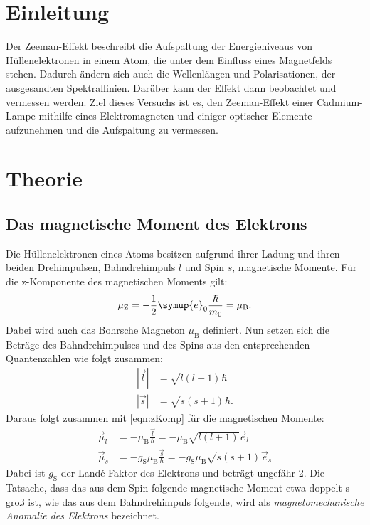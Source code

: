 \section{Einleitung}

Der Zeeman-Effekt beschreibt die Aufspaltung der Energieniveaus von Hüllenelektronen in einem Atom, die unter dem Einfluss eines Magnetfelds stehen. Dadurch ändern sich auch die Wellenlängen und Polarisationen, der ausgesandten Spektrallinien. Darüber kann der Effekt dann beobachtet und vermessen werden. Ziel dieses Versuchs ist es, den Zeeman-Effekt einer Cadmium-Lampe mithilfe eines Elektromagneten und einiger optischer Elemente aufzunehmen und die Aufspaltung zu vermessen.

\section{Theorie}
\label{sec:Theorie}

\subsection{Das magnetische Moment des Elektrons}

Die Hüllenelektronen eines Atoms besitzen aufgrund ihrer Ladung und ihren beiden Drehimpulsen, Bahndrehimpuls $l$ und Spin $s$, magnetische Momente.
Für die z-Komponente des magnetischen Moments gilt:
\begin{align}
  \mu_\text{Z} = -\frac{1}{2} \symup{e}_0 \frac{\hbar}{m_0} = \mu_\text{B}.\label{eqn:zKomp}
\end{align}
Dabei wird auch das Bohrsche Magneton $\mu_\text{B}$ definiert.
Nun setzen sich die Beträge des Bahndrehimpulses und des Spins aus den entsprechenden Quantenzahlen wie folgt zusammen:
\begin{align}
  |\vec l| &= \sqrt{l(l+1)}\hbar\\
  |\vec s| &= \sqrt{s(s+1)}\hbar.
\end{align}
Daraus folgt zusammen mit \eqref{eqn:zKomp} für die magnetischen Momente:
\begin{align}
  \vec\mu_l &= - \mu_\text{B} \frac{\vec l}{\hbar} = - \mu_\text{B} \sqrt{l(l+1)} \vec e_l\\
  \vec\mu_s &= - g_\text{S} \mu_\text{B} \frac{\vec s}{\hbar} = - g_\text{S} \mu_\text{B} \sqrt{s(s+1)} \vec e_s
\end{align}
Dabei ist $g_\text{S}$ der Landé-Faktor des Elektrons und beträgt ungefähr 2. Die Tatsache, dass das aus dem Spin folgende magnetische Moment etwa doppelt s groß ist, wie das aus dem Bahndrehimpuls folgende, wird als \textit{magnetomechanische Anomalie des Elektrons} bezeichnet.

